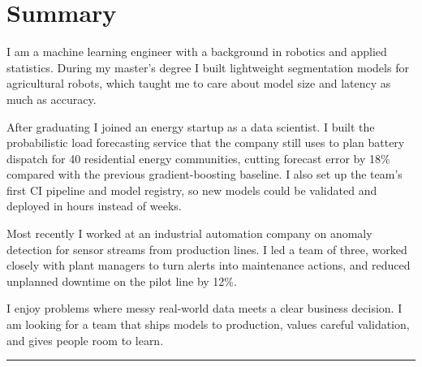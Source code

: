 \section*{Summary}
I am a machine learning engineer with a background in robotics and applied statistics. During my master's degree I built lightweight segmentation models for agricultural robots, which taught me to care about model size and latency as much as accuracy.

After graduating I joined an energy startup as a data scientist. I built the probabilistic load forecasting service that the company still uses to plan battery dispatch for 40 residential energy communities, cutting forecast error by 18\% compared with the previous gradient-boosting baseline. I also set up the team's first CI pipeline and model registry, so new models could be validated and deployed in hours instead of weeks.

Most recently I worked at an industrial automation company on anomaly detection for sensor streams from production lines. I led a team of three, worked closely with plant managers to turn alerts into maintenance actions, and reduced unplanned downtime on the pilot line by 12\%.

I enjoy problems where messy real-world data meets a clear business decision. I am looking for a team that ships models to production, values careful validation, and gives people room to learn.

\vspace{0.5\baselineskip}\hrule\vspace{0.5\baselineskip}

